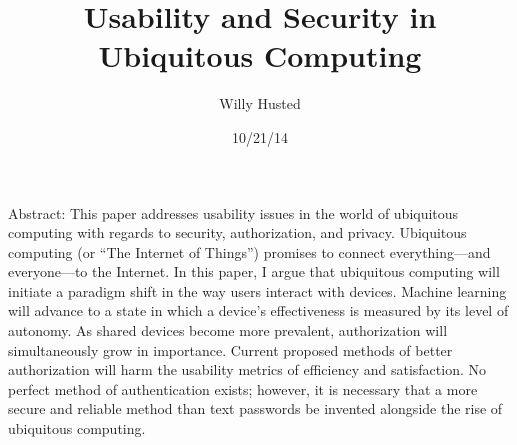 \documentclass[11pt, oneside]{article}   	%
\title{Usability and Security in Ubiquitous Computing}
\author{Willy Husted}
\date{10/21/14}							%
\begin{document}
\maketitle
Abstract: This paper addresses usability issues in the world of ubiquitous computing with regards to security, authorization, and privacy. Ubiquitous computing (or ``The Internet of Things'') promises to connect everything---and everyone---to the Internet. In this paper, I argue that ubiquitous computing will initiate a paradigm shift in the way users interact with devices. Machine learning will advance to a state in which a device's effectiveness is measured by its level of autonomy. As shared devices become more prevalent, authorization will simultaneously grow in importance. Current proposed methods of better authorization will harm the usability metrics of efficiency and satisfaction. No perfect method of authentication exists; however, it is necessary that a more secure and reliable method than text passwords be invented alongside the rise of ubiquitous computing. 

\end{document}
